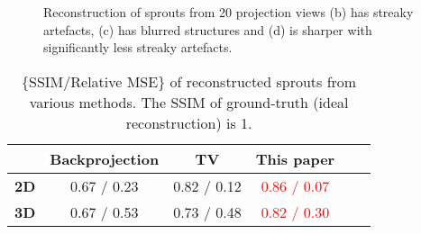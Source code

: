 \documentclass[journal]{IEEEtran}
\begin{document}
\begin{figure}[!h]
\centering
{}
\caption{Reconstruction of sprouts from 20 projection views
   (b) has streaky artefacts, (c) has blurred structures and (d) is sharper with significantly less streaky artefacts.}
\label{fig:sprouts_2D_results}
\end{figure}

\begin{comment}
\begin{figure}[!h]
\centering
\subcaptionbox{Test}{\fcolorbox{yellow}{yellow}{\texttt{[image: ../images/sprouts/post\_TCI/2D/20\_views/test\_zoomed.png]}}}
\subcaptionbox{FDK, no prior}{\texttt{[image: ../images/sprouts/post\_TCI/2D/20\_views/fbp\_zoomed.png]}}
\subcaptionbox{TV, no prior}{\texttt{[image: ../images/sprouts/post\_TCI/2D/20\_views/tv\_zoomed.png]}}
\subcaptionbox{This paper}{\texttt{[image: ../images/sprouts/post\_TCI/2D/20\_views/weighted\_pca\_zoomed.png]}}
\caption{A zoomed-in version of the regions around the RoI of the reconstructions shown in Fig.~\ref{fig:sprouts_2D_results}}
\label{fig:sprouts_zoomed_2D_results}
\end{figure}
\end{comment}
\begin{table}[!h]
  \centering
  \caption{\{SSIM/Relative MSE\} of reconstructed sprouts from various
    methods. The SSIM of ground-truth (ideal reconstruction) is 1.}
\begin{tabular}{|l|c|c|c|c|c|}
\hline &
\textbf{Backprojection} & \textbf{TV} & \textbf{This paper}
 \\ \hline \textbf{2D} & 0.67 / 0.23
& 0.82 / 0.12 & \textcolor{red}{0.86 / 0.07} \\ \hline \textbf{3D} & 0.67 / 0.53 & 0.73 / 0.48 & \textcolor{red}{0.82 / 0.30}
\\ \hline
\end{tabular}
\label{table:sprouts_ssim}
\end{table}
\end{document}
